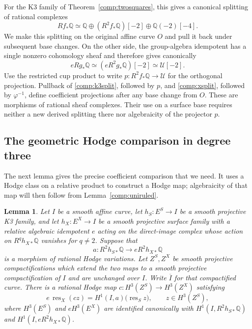 \documentclass[11pt]{amsart}
\newcommand{\Q}{\mathbb Q}
\newtheorem{lemma}[theorem]{Lemma}
\theoremstyle{definition}
\theoremstyle{remark}
\numberwithin{equation}{section}
\begin{document}
For the K3 family of Theorem~\ref{comp:twosquares}, this gives a canonical
splitting of rational complexes
\begin{equation}\label{comp:k3split}
 Rf_*\Q\simeq
 \Q\oplus(R^2f_*\Q)[-2]\oplus\Q(-2)[-4].
\end{equation}
We make this splitting on the original affine curve $O$ and pull it back
under subsequent base changes.  On the other side, the group-algebra
idempotent has a single nonzero cohomology sheaf and therefore gives
canonically
\begin{equation}\label{comp:xsplit}
 eRg_*\Q\simeq (eR^2g_*\Q)[-2]\simeq\mathscr U[-2].
\end{equation}
Use the restricted cup product to write
$p:R^2f_*\Q\to\mathscr U$ for the orthogonal projection.  Pullback of
\eqref{comp:k3split}, followed by $p$, and
\eqref{comp:xsplit}, followed by $\varphi^{-1}$, define coefficient
projections after any base change from $O$.
These are morphisms of rational sheaf complexes.  Their use on a surface
base requires neither a new derived splitting there nor algebraicity of
the projector $p$.

\subsection{The geometric Hodge comparison in degree three}

The next lemma gives the precise coefficient comparison that we need.
It uses a Hodge class on a relative product to construct a Hodge map;
algebraicity of that map will then follow from
Lemma~\ref{comp:uniruled}.

\begin{lemma}\label{comp:hodgelift}
Let $I$ be a smooth affine curve, let $h_S:E^S\to I$ be a smooth
projective K3 family, and let $h_X:E^X\to I$ be a smooth projective
surface family with a relative algebraic idempotent $e$ acting on the direct-image complex whose action on
$R^q h_{X*}\Q$ vanishes for $q\ne2$.  Suppose that
\[
 a:R^2h_{S*}\Q\longrightarrow eR^2h_{X*}\Q
\]
is a morphism of rational Hodge variations.  Let $Z^S,Z^X$ be smooth
projective compactifications which extend the two maps to a smooth
projective compactification of $I$ and are unchanged over $I$.
Write $\overline I$ for that compactified curve.  There is a rational Hodge map
$c:H^3(Z^S)\to H^3(Z^X)$ satisfying
\[
 e\,\operatorname{res}_X(cz)
   =H^1(I,a)\bigl(\operatorname{res}_S z\bigr),
 \qquad z\in H^3(Z^S),
\]
where $H^3(E^S)$ and $eH^3(E^X)$ are identified canonically with
$H^1(I,R^2h_{S*}\Q)$ and $H^1(I,eR^2h_{X*}\Q)$.
\end{lemma}
\end{document}
